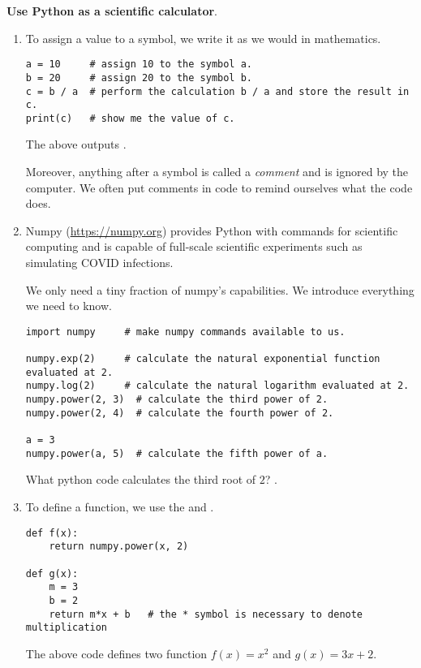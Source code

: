 \documentclass[../main.tex]{subfiles}
\begin{document}
\textbf{Use Python as a scientific calculator}.
\begin{enumerate}
  \item To assign a value to a symbol, we write it as we would in mathematics. 
    \begin{verbatim}
a = 10     # assign 10 to the symbol a.
b = 20     # assign 20 to the symbol b.
c = b / a  # perform the calculation b / a and store the result in c.
print(c)   # show me the value of c.
    \end{verbatim}
    \faComment{} The above outputs \underline{\hspace{3in}}.

    Moreover, anything after a \pythoninline{#} symbol is called a \emph{comment} and is ignored by the computer.  We often put comments in code to remind ourselves what the code does.

  \item Numpy (\url{https://numpy.org}) provides Python with commands for scientific computing and is capable of full-scale scientific experiments such as simulating COVID infections.

    We only need a tiny fraction of numpy's capabilities. We introduce everything we need to know.

    \begin{verbatim}
import numpy     # make numpy commands available to us.

numpy.exp(2)     # calculate the natural exponential function evaluated at 2.
numpy.log(2)     # calculate the natural logarithm evaluated at 2.
numpy.power(2, 3)  # calculate the third power of 2.
numpy.power(2, 4)  # calculate the fourth power of 2.

a = 3
numpy.power(a, 5)  # calculate the fifth power of a.
    \end{verbatim}

    \faComment{} What python code calculates the third root of \(2\)? \underline{\hspace{2in}}.

  \item To define a function, we use the  and .

    \begin{verbatim}
def f(x):
    return numpy.power(x, 2)

def g(x):
    m = 3
    b = 2
    return m*x + b   # the * symbol is necessary to denote multiplication
    \end{verbatim}
    The above code defines two function \(f(x) = x^{2}\) and \(g(x) = 3x + 2\).


\end{enumerate}
\end{document}
